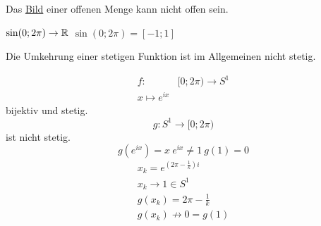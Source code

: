 \begin{Bem}
  Das \underline{Bild} einer offenen Menge kann nicht offen sein.
\end{Bem}
\begin{Bsp}
  $\sin(0;2\pi)\to\mathbb{R}$ $\sin(0;2\pi)=[-1;1]$
\end{Bsp}
\begin{Bem}
  Die Umkehrung einer stetigen Funktion ist im Allgemeinen nicht stetig.
\end{Bem}
\begin{Bsp}
  \begin{align*}
    f:&[0;2\pi)\to S^1\\
    x\mapsto e^{ix}
  \end{align*}
  bijektiv und stetig.
  \[g:S^1\to[0;2\pi)\]
  ist nicht stetig.
  \[g(e^{ix})=x\ e^{ix}\neq 1\ g(1)=0\]
  \begin{gather*}
    x_k=e^{\left( 2\pi-\frac{1}{k} \right)i}\\
    x_k\to 1\in S^1\\
    g(x_k)=2\pi-\frac{1}{k}\\
    g(x_k)\not\to 0=g(1)
  \end{gather*}
\end{Bsp}
